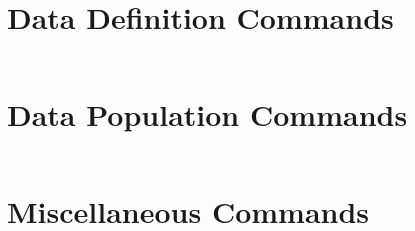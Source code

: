 \documentclass[a4paper,12pt]{article}
\begin{document}
\section{Data Definition Commands}

\begin{verbatim}
\end{verbatim}

\section{Data Population Commands}

\begin{verbatim}
\end{verbatim}

\section{Miscellaneous Commands}

\begin{verbatim}
\end{verbatim}
\end{document}
